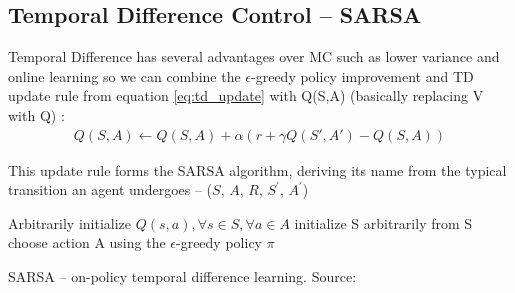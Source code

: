 

\subsection{Temporal Difference Control -- SARSA}
Temporal Difference has several advantages over MC such as lower variance and online learning so we can combine the $\epsilon$-greedy policy improvement and TD update rule from equation \ref{eq:td_update} with Q(S,A) \cite{lecture_mfc} (basically replacing V with Q) :
\begin{align}
    Q(S, A) \longleftarrow Q(S, A) + \alpha (r + \gamma Q(S', A') - Q(S, A)) \label{eq:sarsa_update_rule}
\end{align}

This update rule forms the SARSA algorithm, deriving its name
from the typical transition an agent undergoes -- 
($S$, $A$, $R$, $S^'$, $A^'$)\\

\begin{algorithm}[H]
\SetAlgoLined
Arbitrarily initialize $Q(s, a), \forall s \in S, \forall a \in A$\;
initialize S arbitrarily\;
from S choose action A using the $\epsilon$-greedy policy $\pi$\;
\caption{SARSA -- on-policy temporal difference learning. Source: \cite{lecture_mfc} }
\label{algorithm:sarsa}
\end{algorithm}\\

